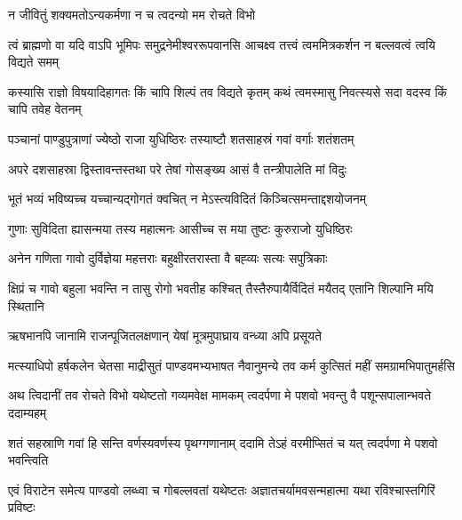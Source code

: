 \onelineindentedshloka
{न जीवितुं शक्यमतोऽन्यकर्मणा}
{न च त्वदन्यो मम रोचते विभो}





\fourlineindentedshloka
{त्वं ब्राह्मणो वा यदि वाऽपि भूमिपः}
{समुद्रनेमीश्वररूपवानसि}
{आचक्ष्व तत्त्वं त्वममित्रकर्शन}
{न बल्लवत्वं त्वयि विद्यते समम्}


\fourlineindentedshloka
{कस्यासि राज्ञो विषयादिहागतः}
{किं चापि शिल्पं तव विद्यते कृतम्}
{कथं त्वमस्मासु निवत्स्यसे सदा}
{वदस्व किं चापि तवेह वेतनम्}




\twolineshloka
{पञ्चानां पाण्डुपुत्राणां ज्येष्ठो राजा युधिष्ठिरः}
{तस्याष्टौ शतसाहस्रं गवां वर्गाः शतंशतम्}


\twolineshloka
{अपरे दशसाहस्रा द्विस्तावन्तस्तथा परे}
{तेषां गोसङ्ख्य आसं वै तन्त्रीपालेति मां विदुः}


\twolineshloka
{भूतं भव्यं भविष्यच्च यच्चान्यद्गोगतं क्वचित्}
{न मेऽस्त्यविदितं किञ्चित्समन्ताद्दशयोजनम्}


\twolineshloka
{गुणाः सुविदिता ह्यासन्मया तस्य महात्मनः}
{आसीच्च स मया तुष्टः कुरुराजो युधिष्ठिरः}


\twolineshloka
{अनेन गणिता गावो दुर्विज्ञेया महत्तराः}
{बहुक्षीरतरास्ता वै बह्व्यः सत्यः सपुत्रिकाः}


\fourlineindentedshloka
{क्षिप्रं च गावो बहुला भवन्ति}
{न तासु रोगो भवतीह कश्चित्}
{तैस्तैरुपायैर्विदितं मयैतद्}
{एतानि शिल्पानि मयि स्थितानि}


\twolineshloka
{ऋषभानपि जानामि राजन्पूजितलक्षणान्}
{येषां मूत्रमुपाघ्राय वन्ध्या अपि प्रसूयते}



\fourlineindentedshloka
{मत्स्याधिपो हर्षकलेन चेतसा}
{माद्रीसुतं पाण्डवमभ्यभाषत}
{नैवानुमन्ये तव कर्म कुत्सितं}
{महीं समग्रामभिपातुमर्हसि}


\fourlineindentedshloka
{अथ त्विदानीं तव रोचते विभो}
{यथेष्टतो गव्यमवेक्ष मामकम्}
{त्वदर्पणा मे पशवो भवन्तु वै}
{पशून्सपालान्भवते ददाम्यहम्}


\fourlineindentedshloka
{शतं सहस्राणि गवां हि सन्ति}
{वर्णस्यवर्णस्य पृथग्गणानाम्}
{ददामि तेऽहं वरमीप्सितं च यत्}
{त्वदर्पणा मे पशवो भवन्त्विति}



\fourlineindentedshloka
{एवं विराटेन समेत्य पाण्डवो}
{लब्ध्वा च गोबल्लवतां यथेष्टतः}
{अज्ञातचर्यामवसन्महात्मा}
{यथा रविश्चास्तगिरिं प्रविष्टः}


